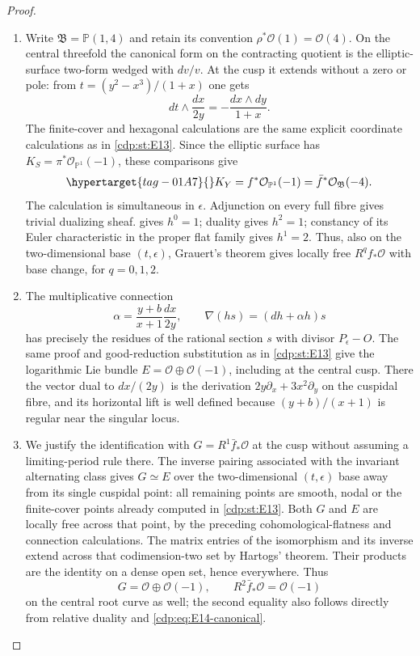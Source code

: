 \begin{proof}
\begin{enumerate}[label={$\langle1\rangle$\arabic*.},leftmargin=*]
\item Write $\mathfrak B=\mathbb P(1,4)$ and retain its convention
$\rho^*\mathcal O(1)=\mathcal O(4)$. On the central threefold the
canonical form on the contracting quotient is the elliptic-surface
two-form wedged with $dv/v$. At the cusp it extends without a zero
or pole: from $t=(y^2-x^3)/(1+x)$ one gets
\[
 dt\wedge\frac{dx}{2y}=-\frac{dx\wedge dy}{1+x}.
\]
The finite-cover and hexagonal calculations are the same explicit
coordinate calculations as in \ref{cdp:st:E13}. Since the elliptic surface has
$K_S=\pi^*\mathcal O_{\mathbb P^1}(-1)$, these comparisons give
\begin{equation}\hypertarget{tag-01A7}{}\label{cdp:eq:E14-canonical}
 K_Y=f^*\mathcal O_{\mathbb P^1}(-1)
     =\bar f^*\mathcal O_{\mathfrak B}(-4).
\end{equation}
The calculation is simultaneous in $\epsilon$. Adjunction on every
full fibre gives trivial dualizing sheaf.  gives $h^0=1$;
duality gives $h^2=1$; constancy of its Euler characteristic in the
proper flat family gives $h^1=2$. Thus, also on the two-dimensional
base $(t,\epsilon)$, Grauert's theorem gives locally free $R^qf_*\mathcal O$
with base change, for $q=0,1,2$.

\item The multiplicative connection
\[
 \alpha=\frac{y+b}{x+1}\frac{dx}{2y},\qquad
 \nabla(hs)=(dh+\alpha h)s
\]
has precisely the residues of the rational section $s$ with divisor
$P_\epsilon-O$. The same proof and good-reduction substitution as
in \ref{cdp:st:E13} give the logarithmic Lie bundle
$E=\mathcal O\oplus\mathcal O(-1)$, including at the central
cusp. There the vector dual to $dx/(2y)$ is the derivation
$2y\partial_x+3x^2\partial_y$ on the cuspidal fibre, and its
horizontal lift is well defined because
$(y+b)/(x+1)$ is regular near the singular locus.

\item We justify the identification with $G=R^1\bar f_*\mathcal O$
at the cusp without assuming a limiting-period rule there.
The inverse pairing associated with the invariant alternating
class gives $G\simeq E$ over the two-dimensional $(t,\epsilon)$
base away from its single cuspidal point: all remaining points
are smooth, nodal or the finite-cover points already computed in
\ref{cdp:st:E13}. Both $G$ and $E$ are locally free across that point, by the
preceding cohomological-flatness and connection calculations.
The matrix entries of the isomorphism and its inverse extend
across that codimension-two set by Hartogs' theorem. Their products
are the identity on a dense open set, hence everywhere. Thus
\[
 G=\mathcal O\oplus\mathcal O(-1),\qquad
 R^2\bar f_*\mathcal O=\mathcal O(-1)
\]
on the central root curve as well; the second equality also follows
directly from relative duality and \eqref{cdp:eq:E14-canonical}.


\end{enumerate}
\end{proof}
